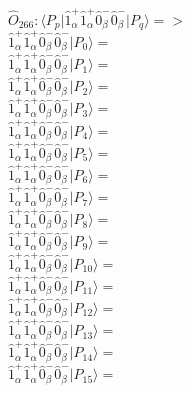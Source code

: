 \documentclass[14pt]{article}
\begin{document}
    $\hat{O}_{266}:  \langle{P_p}\vert \hat{1}_{\alpha}^{+}\hat{1}_{\alpha}^{+}\hat{0}_{\beta}^{-}\hat{0}_{\beta}^{-} \vert{P_q}\rangle => $ \\ 
    $ \hat{1}_{\alpha}^{+}\hat{1}_{\alpha}^{+}\hat{0}_{\beta}^{-}\hat{0}_{\beta}^{-} \vert{P_{0}}\rangle =  $ \\ 
    $ \hat{1}_{\alpha}^{+}\hat{1}_{\alpha}^{+}\hat{0}_{\beta}^{-}\hat{0}_{\beta}^{-} \vert{P_{1}}\rangle =  $ \\ 
    $ \hat{1}_{\alpha}^{+}\hat{1}_{\alpha}^{+}\hat{0}_{\beta}^{-}\hat{0}_{\beta}^{-} \vert{P_{2}}\rangle =  $ \\ 
    $ \hat{1}_{\alpha}^{+}\hat{1}_{\alpha}^{+}\hat{0}_{\beta}^{-}\hat{0}_{\beta}^{-} \vert{P_{3}}\rangle =  $ \\ 
    $ \hat{1}_{\alpha}^{+}\hat{1}_{\alpha}^{+}\hat{0}_{\beta}^{-}\hat{0}_{\beta}^{-} \vert{P_{4}}\rangle =  $ \\ 
    $ \hat{1}_{\alpha}^{+}\hat{1}_{\alpha}^{+}\hat{0}_{\beta}^{-}\hat{0}_{\beta}^{-} \vert{P_{5}}\rangle =  $ \\ 
    $ \hat{1}_{\alpha}^{+}\hat{1}_{\alpha}^{+}\hat{0}_{\beta}^{-}\hat{0}_{\beta}^{-} \vert{P_{6}}\rangle =  $ \\ 
    $ \hat{1}_{\alpha}^{+}\hat{1}_{\alpha}^{+}\hat{0}_{\beta}^{-}\hat{0}_{\beta}^{-} \vert{P_{7}}\rangle =  $ \\ 
    $ \hat{1}_{\alpha}^{+}\hat{1}_{\alpha}^{+}\hat{0}_{\beta}^{-}\hat{0}_{\beta}^{-} \vert{P_{8}}\rangle =  $ \\ 
    $ \hat{1}_{\alpha}^{+}\hat{1}_{\alpha}^{+}\hat{0}_{\beta}^{-}\hat{0}_{\beta}^{-} \vert{P_{9}}\rangle =  $ \\ 
    $ \hat{1}_{\alpha}^{+}\hat{1}_{\alpha}^{+}\hat{0}_{\beta}^{-}\hat{0}_{\beta}^{-} \vert{P_{10}}\rangle =  $ \\ 
    $ \hat{1}_{\alpha}^{+}\hat{1}_{\alpha}^{+}\hat{0}_{\beta}^{-}\hat{0}_{\beta}^{-} \vert{P_{11}}\rangle =  $ \\ 
    $ \hat{1}_{\alpha}^{+}\hat{1}_{\alpha}^{+}\hat{0}_{\beta}^{-}\hat{0}_{\beta}^{-} \vert{P_{12}}\rangle =  $ \\ 
    $ \hat{1}_{\alpha}^{+}\hat{1}_{\alpha}^{+}\hat{0}_{\beta}^{-}\hat{0}_{\beta}^{-} \vert{P_{13}}\rangle =  $ \\ 
    $ \hat{1}_{\alpha}^{+}\hat{1}_{\alpha}^{+}\hat{0}_{\beta}^{-}\hat{0}_{\beta}^{-} \vert{P_{14}}\rangle =  $ \\ 
    $ \hat{1}_{\alpha}^{+}\hat{1}_{\alpha}^{+}\hat{0}_{\beta}^{-}\hat{0}_{\beta}^{-} \vert{P_{15}}\rangle =  $ \\ 
    
\end{document}
